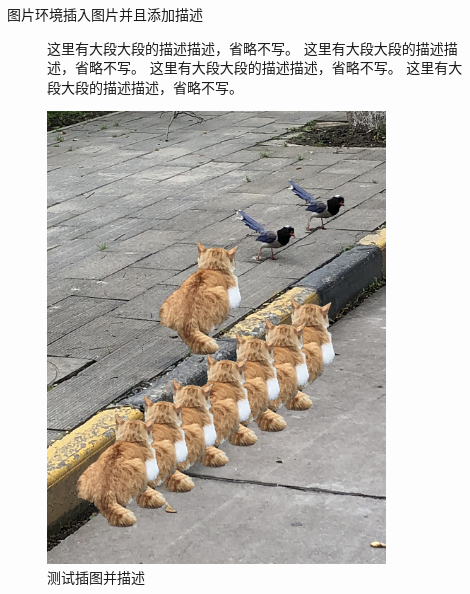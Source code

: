 \documentclass[no-math, compress]{beamer}
\begin{document}
\begin{frame}{图片环境}{插入图片并且添加描述}
    \begin{figure}
        \centering
        \begin{minipage}[t]{0.4\textwidth}
            \centering
            这里有大段大段的描述描述，省略不写。
            这里有大段大段的描述描述，省略不写。
            这里有大段大段的描述描述，省略不写。
            这里有大段大段的描述描述，省略不写。
        \end{minipage}
        \qquad
        \begin{minipage}[t]{0.4\textwidth}
            \centering\vspace{0pt}
            \includegraphics[width=0.8\textwidth]{image01}
        \end{minipage}
        \caption{测试插图并描述}
    \end{figure}
\end{frame}
\end{document}
